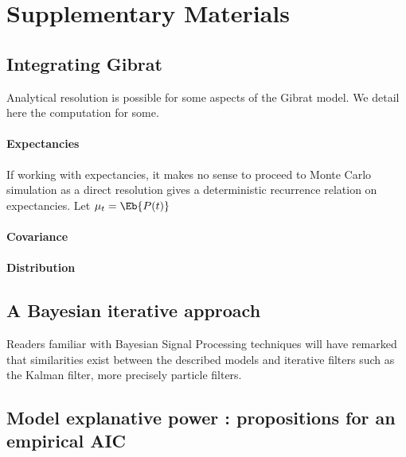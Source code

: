 \section{Supplementary Materials}


\subsection{Integrating Gibrat}

Analytical resolution is possible for some aspects of the Gibrat model. We detail here the computation for some.

\paragraph{Expectancies} If working with expectancies, it makes no sense to proceed to Monte Carlo simulation as a direct resolution gives a deterministic recurrence relation on expectancies. Let $\mu_t = \Eb{P(t)}$

\paragraph{Covariance}


\paragraph{Distribution}



\subsection{A Bayesian iterative approach}

Readers familiar with Bayesian Signal Processing techniques will have remarked that similarities exist between the described models and iterative filters such as the Kalman filter, more precisely particle filters.



\subsection{Model explanative power : propositions for an empirical AIC}










